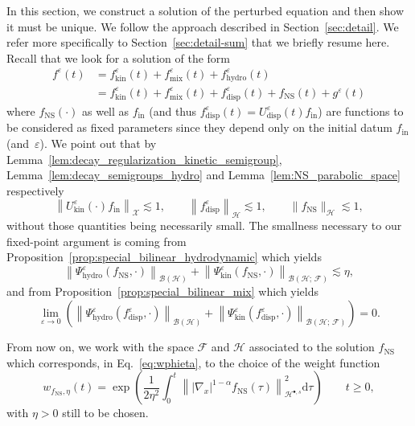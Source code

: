 \documentclass[10pt]{amsart}
\theoremstyle{definition}\newtheorem{defi}[theo]{Definition}\newtheorem{rema}[theo]{Remark}\newtheorem{exam}[theo]{Example}\newtheorem{exem}[theo]{Example}\newtheorem{nota}[theo]{Notation}
\newcommand{\ini}{\mathrm{in}}
\newcommand{\ns}{\mathrm{NS}}
\newcommand{\hyd}{\mathrm{hydro}}
\newcommand{\mix}{\mathrm{mix}}
\newcommand{\kin}{\mathrm{kin}}
\renewcommand{\d}{\mathrm{d}}
\newcommand{\disp}{\mathrm{disp}}
\newcommand{\HH}{\mathcal{H}}
\newcommand{\BBB}{\mathscr{B}}
\newcommand{\FFF}{\mathscr{F}}
\newcommand{\HHH}{\mathscr{H}}
\newcommand{\GGG}{\mathscr{X}}
\newcommand{\rSSsp}[1]{\HH^{{\bullet}, #1}}
\newcommand{\SSSs}{\HHH}
\newcommand{\SSSl}{\GGG}
\newcommand{\SSSm}{\FFF}
\renewcommand*\ge{\geqslant}
\newcommand*\eps{{\varepsilon}}
\begin{document}
In this section, we construct a solution of the perturbed equation and then show it must be unique. We follow the approach described in Section~\ref{sec:detail}. We refer more specifically to Section~\ref{sec:detail-sum} that we briefly resume here. Recall that we look for a solution of the form
\begin{equation}\label{eq:ansatz}
\begin{split}
f^\eps(t)&=f^\eps_\kin(t)+f^\eps_\mix(t)+f^\eps_\hyd(t)\\
&=f^\eps_\kin(t)+f^\eps_\mix(t)+f^\eps_\disp(t)+ f_\ns(t)+g^\eps(t)
\end{split}
\end{equation}
where $f_\ns(\cdot)$ as well as $f_\ini$ (and thus $f^\eps_\disp(t) = U^\eps_\disp(t) f_\ini$) are functions to be considered as fixed parameters since they depend only on the initial datum $f_\ini$ (and~$\eps$). We point out that by Lemma~\ref{lem:decay_regularization_kinetic_semigroup}, Lemma~\ref{lem:decay_semigroups_hydro} and Lemma~\ref{lem:NS_parabolic_space} respectively
\[
\left\| U^\eps_\kin(\cdot) f_\ini \right\|_{\SSSl} \lesssim 1, \qquad \left\| f^\eps_\disp \right\|_{\SSSs} \lesssim 1, \qquad \| f_\ns \|_{\SSSs} \lesssim 1,
\]
without those quantities being necessarily small. The smallness necessary to our fixed-point argument is coming from Proposition~\ref{prop:special_bilinear_hydrodynamic} which yields
\[
\left\| \Psi^\eps_\hyd(f_\ns, \cdot) \right\|_{ \BBB\left(\SSSs \right) } + \left\| \Psi^\eps_\kin(f_\ns, \cdot) \right\|_{ \BBB\left(\SSSs ;\,\SSSm \right) } \lesssim \eta,
\]
and from Proposition~\ref{prop:special_bilinear_mix} which yields
\[
\lim_{\eps \to 0} \left(\left\| \Psi^\eps_\hyd(f_\disp^\eps, \cdot) \right\|_{ \BBB\left(\SSSs \right) } + \left\| \Psi^\eps_\kin\left(f_\disp^\eps, \cdot\right) \right\|_{ \BBB\left(\SSSs ;\, \SSSm \right) } \right) = 0.
\]

From now on, we work with the space $\SSSm$ and $\SSSs$ associated to the solution $f_\ns$ which corresponds, in Eq.~\eqref{eq:wphieta}, to the choice of the weight function
\[
w_{f_\ns,\eta}(t)=\exp\left(\frac{1}{2 \eta^2} \int_0^t\left\| |\nabla_x|^{1-\alpha} f_\ns(\tau) \right\|_{\rSSsp{s}}^2 \d \tau \right) \qquad t \ge0,
\]
with $\eta >0$ still to be chosen.
\end{document}
